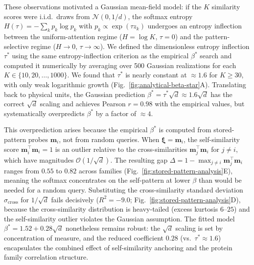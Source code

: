 These observations motivated a Gaussian mean-field model: if the $K$ similarity scores were i.i.d.\ draws from $\mathcal{N}(0, 1/d)$, the softmax entropy $H(\tau) = -\sum_k p_k \log p_k$ with $p_k \propto \exp(\tau z_k)$ undergoes an entropy inflection between the uniform-attention regime ($H = \log K$, $\tau = 0$) and the pattern-selective regime ($H \to 0$, $\tau \to \infty$). We defined the dimensionless entropy inflection $\tau^*$ using the same entropy-inflection criterion as the empirical $\beta^*$ search and computed it numerically by averaging over 500 Gaussian realizations for each $K \in \{10, 20, \ldots, 1000\}$. We found that $\tau^*$ is nearly constant at $\approx 1.6$ for $K \geq 30$, with only weak logarithmic growth (Fig.~\ref{fig:analytical-beta-star}A). Translating back to physical units, the Gaussian prediction $\beta^* = \tau^*\sqrt{d} \approx 1.6\sqrt{d}$ has the correct $\sqrt{d}$ scaling and achieves Pearson $r = 0.98$ with the empirical values, but systematically overpredicts $\beta^*$ by a factor of $\approx 4$.

This overprediction arises because the empirical $\beta^*$ is computed from stored-pattern probes $\mathbf{m}_i$, not from random queries. When $\boldsymbol{\xi} = \mathbf{m}_i$, the self-similarity score $\mathbf{m}_i^\top\mathbf{m}_i = 1$ is an outlier relative to the cross-similarities $\mathbf{m}_j^\top\mathbf{m}_i$ for $j \neq i$, which have magnitudes $\mathcal{O}(1/\sqrt{d})$. The resulting gap $\Delta = 1 - \max_{j\neq i}\mathbf{m}_j^\top\mathbf{m}_i$ ranges from $0.55$ to $0.82$ across families (Fig.~\ref{fig:stored-pattern-analysis}E), meaning the softmax concentrates on the self-pattern at lower $\beta$ than would be needed for a random query. Substituting the cross-similarity standard deviation $\sigma_{\mathrm{cross}}$ for $1/\sqrt{d}$ fails decisively ($R^2 = -9.0$; Fig.~\ref{fig:stored-pattern-analysis}D), because the cross-similarity distribution is heavy-tailed (excess kurtosis $6$--$25$) and the self-similarity outlier violates the Gaussian assumption. The fitted model $\beta^* = 1.52 + 0.28\sqrt{d}$ nonetheless remains robust: the $\sqrt{d}$ scaling is set by concentration of measure, and the reduced coefficient $0.28$ (vs.\ $\tau^* \approx 1.6$) encapsulates the combined effect of self-similarity anchoring and the protein family correlation structure.

